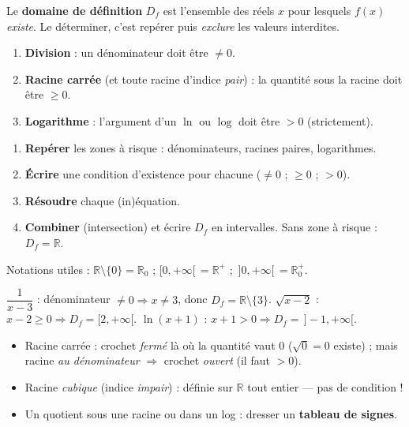 \documentclass[11pt,a4paper]{article}
\newcommand{\R}{\mathbb{R}}\newcommand{\Z}{\mathbb{Z}}\newcommand{\N}{\mathbb{N}}
\newcommand{\Df}{D_f}
\begin{document}
Le \textbf{domaine de définition} $\Df$ est l'ensemble des réels $x$ pour lesquels $f(x)$ \emph{existe}. Le déterminer, c'est repérer puis \emph{exclure} les valeurs interdites.

\begin{idee}
\begin{enumerate}[leftmargin=1.8em,topsep=2pt,itemsep=1pt]
  \item \textbf{Division} : un dénominateur doit être $\neq 0$.
  \item \textbf{Racine carrée} (et toute racine d'indice \emph{pair}) : la quantité sous la racine doit être $\geq 0$.
  \item \textbf{Logarithme} : l'argument d'un $\ln$ ou $\log$ doit être $>0$ (strictement).
\end{enumerate}
\end{idee}

\begin{methode}
\begin{enumerate}[leftmargin=1.8em,topsep=2pt,itemsep=1pt]
  \item \textbf{Repérer} les zones à risque : dénominateurs, racines paires, logarithmes.
  \item \textbf{Écrire} une condition d'existence pour chacune ($\neq 0$ ; $\geq 0$ ; $>0$).
  \item \textbf{Résoudre} chaque (in)équation.
  \item \textbf{Combiner} (intersection) et écrire $\Df$ en intervalles. Sans zone à risque : $\Df=\R$.
\end{enumerate}
\end{methode}

Notations utiles : $\R\setminus\{0\}=\R_0$ ; $[0,+\infty[\,=\R^{+}$ ; $\,]0,+\infty[\,=\R_0^{+}$.

\begin{exemple}
$\dfrac{1}{x-3}$ : dénominateur $\neq 0\Rightarrow x\neq 3$, donc $\Df=\R\setminus\{3\}$. \quad
$\sqrt{x-2}$ : $x-2\geq 0\Rightarrow \Df=[2,+\infty[$. \quad
$\ln(x+1)$ : $x+1>0\Rightarrow \Df=\,]-1,+\infty[$.
\end{exemple}

\begin{piege}
\begin{itemize}[leftmargin=1.4em,topsep=2pt,itemsep=1pt]
  \item Racine carrée : crochet \emph{fermé} là où la quantité vaut $0$ ($\sqrt{0}=0$ existe) ; mais racine \emph{au dénominateur} $\Rightarrow$ crochet \emph{ouvert} (il faut $>0$).
  \item Racine \emph{cubique} (indice \emph{impair}) : définie sur $\R$ tout entier — pas de condition !
  \item Un quotient sous une racine ou dans un log : dresser un \textbf{tableau de signes}.
\end{itemize}
\end{piege}
\end{document}
